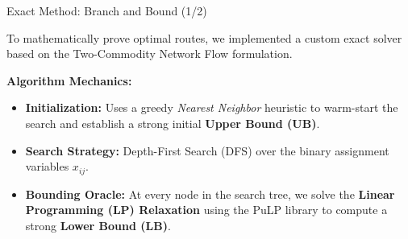 \documentclass[11pt,aspectratio=169]{beamer}
\begin{document}
\begin{frame}{Exact Method: Branch and Bound (1/2)}

To mathematically prove optimal routes, we implemented a custom exact solver based on the Two-Commodity Network Flow formulation.

\vspace{0.4cm}

\textbf{Algorithm Mechanics:}
\begin{itemize}
    \item \textbf{Initialization:} Uses a greedy \emph{Nearest Neighbor} heuristic to warm-start the search and establish a strong initial \textbf{Upper Bound (UB)}.

    \item \textbf{Search Strategy:} Depth-First Search (DFS) over the binary assignment variables $x_{ij}$.

    \item \textbf{Bounding Oracle:} At every node in the search tree, we solve the \textbf{Linear Programming (LP) Relaxation} using the PuLP library to compute a strong \textbf{Lower Bound (LB)}.
\end{itemize}

\end{frame}
\end{document}
